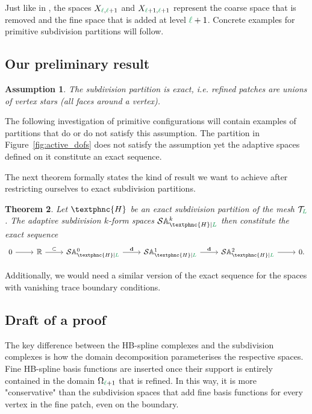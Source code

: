 \documentclass[12pt, a4paper]{article}
\newcommand{\green}{\color{ForestGreen}}
\newcommand{\T}{\mathcal{T}}
\renewcommand{\l}{{\green\ell}}
\renewcommand{\L}{{\green L}}
\newcommand{\extd}{\mathbf{d}}
\newcommand{\heth}{\textphnc{H}}
\newcommand{\C}{\heth}
\newcommand{\activeDoFs}{\mathbb{A}}
\newcommand{\hierSDFspace}[3]{\mathcal{S}\activeDoFs^{#1}_{#2 \vert #3}}
\newtheorem{theorem}{Theorem}[section]
\newtheorem{assumption}[theorem]{Assumption}
\numberwithin{equation}{section}
\begin{document}
Just like in \cite{Evans.2020}, the spaces $X_{\l,\l+1}$ and $X_{\l+1, \l+1}$ represent the coarse space that is removed and the fine space that is added at level $\l+1$. Concrete examples for primitive subdivision partitions will follow.

\subsection{Our preliminary result}

\begin{assumption}
    \label{ass:exact_partition}
    The subdivision partition is \emph{exact}, i.e. refined patches are unions of vertex stars (all faces around a vertex).
\end{assumption}

The following investigation of primitive configurations will contain examples of partitions that do or do not satisfy this assumption. The partition in Figure~\ref{fig:active_dofs} does not satisfy the assumption yet the adaptive spaces defined on it constitute an exact sequence.

The next theorem formally states the kind of result we want to achieve after restricting ourselves to exact subdivision partitions.

\begin{theorem}
    Let $\C$ be an exact subdivision partition of the mesh $\T_\L$. The adaptive subdivision $k$-form spaces $\hierSDFspace{k}{\C}{\L}$ then constitute the exact sequence
    \begin{equation}
    \begin{tikzcd}
        0 \arrow[r] & \mathbb{R} \arrow[r, "\subset"] & \hierSDFspace{0}{\C}{\L} \arrow[r, "\extd"] & \hierSDFspace{1}{\C}{\L} \arrow[r, "\extd"] & \hierSDFspace{2}{\C}{\L} \arrow[r] & 0.
    \end{tikzcd}
    \end{equation}
\end{theorem}

Additionally, we would need a similar version of the exact sequence for the spaces with vanishing trace boundary conditions.

\subsection{Draft of a proof}

The key difference between the HB-spline complexes and the subdivision complexes is how the domain decomposition parameterises the respective spaces. Fine HB-spline basis functions are inserted once their support is entirely contained in the domain $\Omega_{\l+1}$ that is refined. In this way, it is more "conservative" than the subdivision spaces that add fine basis functions for every vertex in the fine patch, even on the boundary.
\end{document}
